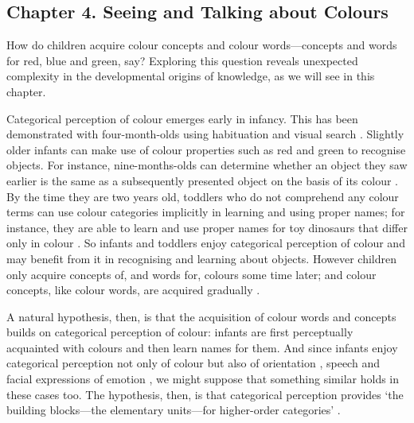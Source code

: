 \documentclass[12pt,\papersize]{extarticle}
\begin{document}
\subsection{Chapter 4. Seeing and Talking about Colours}
How do children acquire colour concepts and colour words---concepts and words for red, blue and green, say? 
Exploring this question reveals unexpected complexity in the developmental origins of knowledge, as we will see in this chapter.


Categorical perception of colour emerges early in infancy.  This has been demonstrated with four-month-olds using habituation \citep{Bornstein:1976of} and visual search \citep{Franklin:2005xk}.   
Slightly older infants can make use of colour properties such as red and green to recognise objects.  
For instance, nine-months-olds can determine whether an object they saw earlier is the same as a subsequently presented object on the basis of its colour \citep{Wilcox:2008jk}.  
By the time they are two years old, toddlers who do not comprehend any colour terms can use colour categories implicitly in learning and using proper names; for instance, they are able to learn and use proper names for toy dinosaurs that differ only in colour \citep[][Experiment 3]{Soja:1994np}.  
So infants and toddlers enjoy categorical perception of colour and may benefit from it in recognising and learning about objects.  
However children only acquire concepts of, and words for, colours some time later; and colour concepts, like colour words, are acquired gradually \citep{Pitchford:2005hm,Kowalski:2006hk,Sandhofer:1999if,Sandhofer:2006qo}. 

A natural hypothesis, then, is that the acquisition of colour words and concepts builds on categorical perception of colour: infants are first perceptually acquainted with colours and then learn names for them.
And since infants enjoy categorical perception not only of colour but also of orientation \citep{franklin:2010_hemispheric}, speech \citep{Kuhl:1987la,Kuhl:2004nv,Jusczyk:1995it} and facial expressions of emotion \citep{Etcoff:1992zd,Kotsoni:2001ph,Campanella:2002aa}, 
we might suppose that something similar holds in these cases too.
The hypothesis, then, is that categorical perception provides `the building blocks—the elementary units—for higher-order categories' \citep[p.\ 3]{Harnad:1987ej}.
\end{document}

